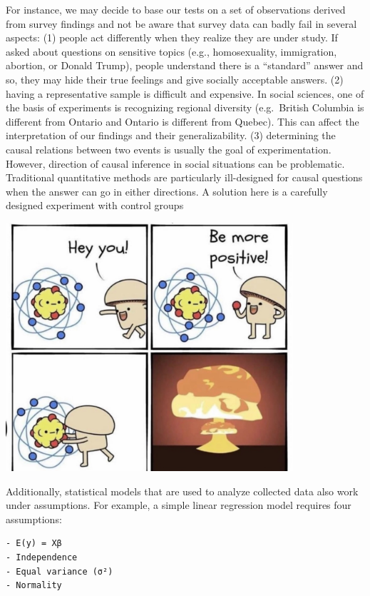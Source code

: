 \documentclass[]{book}
\begin{document}
For instance, we may decide to base our tests on a set of observations derived from survey findings and not be aware that survey data can badly fail in several aspects:
(1) people act differently when they realize they are under study. If asked about questions on sensitive topics (e.g., homosexuality, immigration, abortion, or Donald Trump), people understand there is a ``standard'' answer and so, they may hide their true feelings and give socially acceptable answers.
(2) having a representative sample is difficult and expensive. In social sciences, one of the basis of experiments is recognizing regional diversity (e.g.~British Columbia is different from Ontario and Ontario is different from Quebec). This can affect the interpretation of our findings and their generalizability.
(3) determining the causal relations between two events is usually the goal of experimentation. However, direction of causal inference in social situations can be problematic. Traditional quantitative methods are particularly ill-designed for causal questions when the answer can go in either directions. A solution here is a carefully designed experiment with control groups

\includegraphics[width=0.8\textwidth,height=\textheight]{fig/positivity.jpg}

Additionally, statistical models that are used to analyze collected data also work under assumptions. For example, a simple linear regression model requires four assumptions:

\begin{verbatim}
- E(y) = Xβ
- Independence
- Equal variance (σ²)
- Normality
\end{verbatim}
\end{document}
